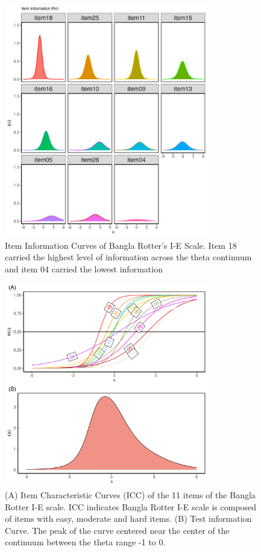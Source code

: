 \documentclass[
  man]{apa6}
\begin{document}
\begin{figure}
\includegraphics[width=3.5in]{Figures/300/Figure6} \caption{Item Information Curves of Bangla Rotter’s I-E Scale. Item 18 carried the highest level of information across the theta continuum and item 04 carried the lowest information}\label{fig:FigTIC}
\end{figure}

\begin{figure}
\includegraphics[width=3.5in]{Figures/300/Figure5} \caption{(A) Item Characteristic Curves (ICC) of the 11 items of the Bangla Rotter I-E scale. ICC indicates Bangla Rotter I-E scale is composed of items with easy, moderate and hard items. (B) Test information Curve. The peak of the curve centered near the center of the continuum between the theta range -1 to 0.}\label{fig:figICC}
\end{figure}
\end{document}
